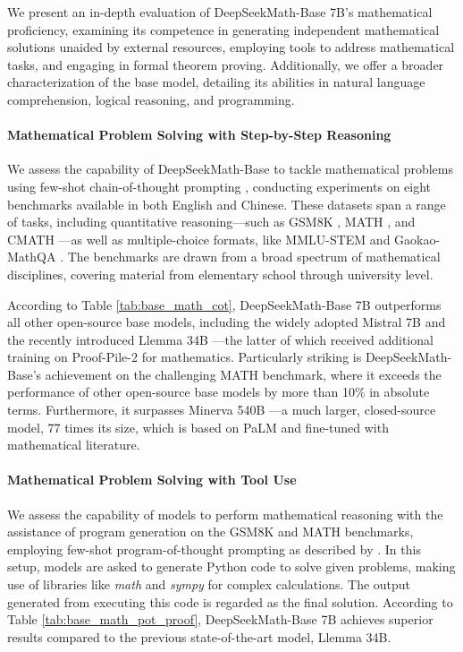 We present an in-depth evaluation of DeepSeekMath-Base 7B’s mathematical proficiency, examining its competence in generating independent mathematical solutions unaided by external resources, employing tools to address mathematical tasks, and engaging in formal theorem proving. Additionally, we offer a broader characterization of the base model, detailing its abilities in natural language comprehension, logical reasoning, and programming.

\paragraph{Mathematical Problem Solving with Step-by-Step Reasoning}

We assess the capability of DeepSeekMath-Base to tackle mathematical problems using few-shot chain-of-thought prompting \citep{cot}, conducting experiments on eight benchmarks available in both English and Chinese. These datasets span a range of tasks, including quantitative reasoning—such as GSM8K \citep{gsm8k}, MATH \citep{MATH}, and CMATH \citep{wei2023cmath}—as well as multiple-choice formats, like MMLU-STEM \citep{mmlu} and Gaokao-MathQA \citep{agieval}. The benchmarks are drawn from a broad spectrum of mathematical disciplines, covering material from elementary school through university level.

According to Table \ref{tab:base_math_cot}, DeepSeekMath-Base 7B outperforms all other open-source base models, including the widely adopted Mistral 7B \citep{mistral} and the recently introduced Llemma 34B \citep{llemma}—the latter of which received additional training on Proof-Pile-2 \citep{llemma} for mathematics. Particularly striking is DeepSeekMath-Base’s achievement on the challenging MATH benchmark, where it exceeds the performance of other open-source base models by more than 10\% in absolute terms. Furthermore, it surpasses Minerva 540B \citep{minerva}—a much larger, closed-source model, 77 times its size, which is based on PaLM \citep{palm} and fine-tuned with mathematical literature.

\paragraph{Mathematical Problem Solving with Tool Use} We assess the capability of models to perform mathematical reasoning with the assistance of program generation on the GSM8K and MATH benchmarks, employing few-shot program-of-thought prompting as described by \citet{pot,pal}. In this setup, models are asked to generate Python code to solve given problems, making use of libraries like \textit{math} and \textit{sympy} for complex calculations. The output generated from executing this code is regarded as the final solution. According to Table \ref{tab:base_math_pot_proof}, DeepSeekMath-Base 7B achieves superior results compared to the previous state-of-the-art model, Llemma 34B.


